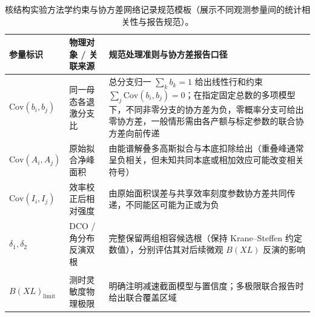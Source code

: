 \begin{table}[!htbp]
\centering\small\setlength{\tabcolsep}{2pt}
\caption{核结构实验方法学约束与协方差网络记录规范模板（展示不同观测参量间的统计相关性与报告规范）。}
\label{tab:5-10-method-cov-template}
\begin{tabular}{@{}>{\raggedright\arraybackslash}p{}>{\raggedright\arraybackslash}p{}>{\raggedright\arraybackslash}p{}@{}}
\toprule
参量标识 & 物理对象 / 关联来源 & 规范处理准则与协方差报告口径 \\
\midrule
$\mathrm{Cov}(b_i, b_j)$ & 同一母态各退激分支比 & 总分支归一 $\sum_k b_k = 1$ 给出线性行和约束 $\sum_j \mathrm{Cov}(b_i, b_j) = 0$；在指定固定总数的多项模型下，不同非零分支的协方差为负，零概率分支可给出零协方差，一般情形需由各产额与标定参数的联合协方差向前传递 \\
$\mathrm{Cov}(A_i, A_j)$ & 原始拟合净峰面积 & 由能谱解叠多高斯拟合与本底扣除给出（重叠峰通常呈负相关，但未知共同本底或相加效应可能改变相关符号） \\
$\mathrm{Cov}(I_i, I_j)$ & 效率校正后相对强度 & 由原始面积误差与共享效率刻度参数协方差共同传递，不同能区可能为正或为负 \\
$\delta_1, \delta_2$ & DCO / 角分布反演双根 & 完整保留两组相容候选根（保持 Krane--Steffen 约定数值），分别评估其对后续微观 $B(XL)$ 反演的影响 \\
\shortstack[l]{$\tau_{\mathrm{limit}}$\\$B(XL)_{\mathrm{limit}}$} & 测时灵敏度物理极限 & 明确注明减速截面模型与置信度；多极限联合报告时给出联合覆盖区域 \\
\bottomrule
\end{tabular}
\end{table}

